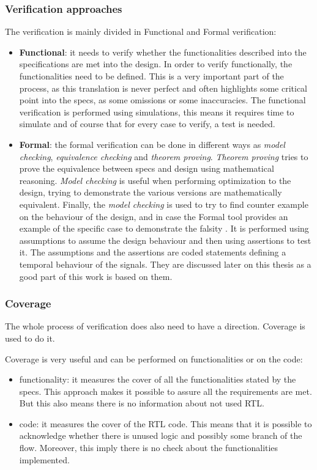\subsubsection{Verification approaches}
The verification is mainly divided in Functional and Formal verification:
\begin{itemize}
    \item \textbf{Functional}: it needs to verify whether the functionalities described into the specifications are met into the design. In order to verify functionally, the functionalities need to be defined. This is a very important part of the process, as this translation is never perfect and often highlights some critical point into the specs, as some omissions or some inaccuracies. The functional verification is performed using simulations, this means it requires time to simulate and of course that for every case to verify, a test is needed.
    
    \item \textbf{Formal}: the formal verification can be done in different ways as \textit{model checking}, \textit{equivalence checking} and \textit{theorem proving}. \textit{Theorem proving} tries to prove the equivalence between specs and design using mathematical reasoning. \textit{Model checking} is useful when performing optimization to the design, trying to demonstrate the various versions are mathematically equivalent. Finally, the \textit{model checking} is used to try to find counter example on the behaviour of the design, and in case the Formal tool provides an example of the specific case to demonstrate the falsity . It is performed using assumptions to assume the design behaviour and then using assertions to test it. The assumptions and the assertions are coded statements defining a temporal behaviour of the signals. They are discussed later on this thesis as a good part of this work is based on them.
\end{itemize}

\bigskip

\subsubsection{Coverage}
The whole process of verification does also need to have a direction. Coverage is used to do it.

Coverage is very useful and can be performed on functionalities or on the code:
\begin{itemize}
    \item functionality: it measures the cover of all the functionalities stated by the specs. This approach makes it possible to assure all the requirements are met. But this also means there is no information about not used RTL.
    
    \item code: it measures the cover of the RTL code. This means that it is possible to acknowledge whether there is unused logic and possibly some branch of the flow. Moreover, this imply there is no check about the functionalities implemented.

\end{itemize}

